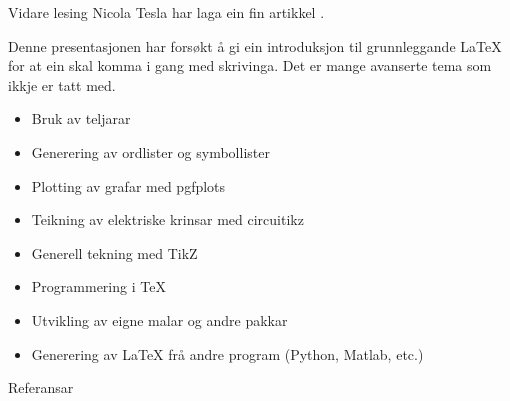 \documentclass[10pt,a4paper]{beamer}
\begin{document}
	\begin{frame}{Vidare lesing}
	Nicola Tesla har laga ein fin artikkel \cite{tesla1888}.
	
	Denne presentasjonen har forsøkt å gi ein introduksjon til grunnleggande \LaTeX{} for at ein skal komma i gang med skrivinga. Det er mange avanserte tema som ikkje er tatt med.
	
	\begin{itemize}
		\item Bruk av teljarar
		\item Generering av ordlister og symbollister
		\item Plotting av grafar med pgfplots
		\item Teikning av elektriske krinsar med circuitikz
		\item Generell tekning med TikZ
		\item Programmering i \TeX{}
		\item Utvikling av eigne malar og andre pakkar
		\item Generering av \LaTeX{} frå andre program (Python, Matlab, etc.)
	\end{itemize}
	
	
	\end{frame}

	\begin{frame}{Referansar}	
	
	\printbibliography 
	
	\end{frame}
	
	
\end{document}
